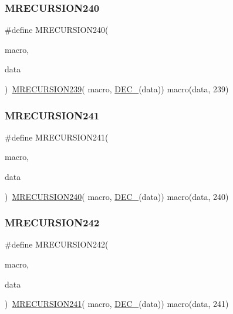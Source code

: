 \subsubsection{\texorpdfstring{MRECURSION240}{MRECURSION240}}
{\footnotesize\ttfamily \#define M\+R\+E\+C\+U\+R\+S\+I\+O\+N240(\begin{DoxyParamCaption}\item[{}]{macro,  }\item[{}]{data }\end{DoxyParamCaption})~\mbox{\hyperlink{group__group__sam0__utils__mrecursion_ga6ab69c1fbf584a9c78f9ab0929850a32}{M\+R\+E\+C\+U\+R\+S\+I\+O\+N239}}(  macro, \mbox{\hyperlink{group__group__sam0__utils__mrecursion_ga1d23d683797679dca8c3512a54a5dcae}{D\+E\+C\+\_\+}}(data))   macro(data, 239)}

\mbox{\label{group__group__sam0__utils__mrecursion_ga0a5cf75038514f2ec97ba39d8bee8e7a}} 
\subsubsection{\texorpdfstring{MRECURSION241}{MRECURSION241}}
{\footnotesize\ttfamily \#define M\+R\+E\+C\+U\+R\+S\+I\+O\+N241(\begin{DoxyParamCaption}\item[{}]{macro,  }\item[{}]{data }\end{DoxyParamCaption})~\mbox{\hyperlink{group__group__sam0__utils__mrecursion_ga9923ea8aad0a2c13e0685441357f2e96}{M\+R\+E\+C\+U\+R\+S\+I\+O\+N240}}(  macro, \mbox{\hyperlink{group__group__sam0__utils__mrecursion_ga1d23d683797679dca8c3512a54a5dcae}{D\+E\+C\+\_\+}}(data))   macro(data, 240)}

\mbox{\label{group__group__sam0__utils__mrecursion_gac9925d3d1732bd7e47e61f7c9dfeafbd}} 
\subsubsection{\texorpdfstring{MRECURSION242}{MRECURSION242}}
{\footnotesize\ttfamily \#define M\+R\+E\+C\+U\+R\+S\+I\+O\+N242(\begin{DoxyParamCaption}\item[{}]{macro,  }\item[{}]{data }\end{DoxyParamCaption})~\mbox{\hyperlink{group__group__sam0__utils__mrecursion_ga0a5cf75038514f2ec97ba39d8bee8e7a}{M\+R\+E\+C\+U\+R\+S\+I\+O\+N241}}(  macro, \mbox{\hyperlink{group__group__sam0__utils__mrecursion_ga1d23d683797679dca8c3512a54a5dcae}{D\+E\+C\+\_\+}}(data))   macro(data, 241)}

